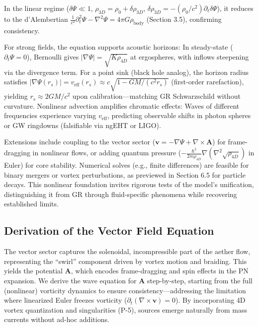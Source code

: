 \documentclass{article}
\begin{document}
In the linear regime ($\delta \Psi \ll 1$, $\rho_{3D} = \rho_0 + \delta \rho_{3D}$, $\delta \rho_{3D} = -(\rho_0 / c^2) \partial_t \delta \Psi$), it reduces to the d'Alembertian $\frac{1}{c^2} \partial_t^2 \Psi - \nabla^2 \Psi = 4\pi G \rho_{\text{body}}$ (Section 3.5), confirming consistency.

For strong fields, the equation supports acoustic horizons: In steady-state ($\partial_t \Psi = 0$), Bernoulli gives $|\nabla \Psi| = \sqrt{K \rho_{4D}}$ at ergospheres, with inflows steepening via the divergence term. For a point sink (black hole analog), the horizon radius satisfies $|\nabla \Psi(r_s)| = v_{\text{eff}}(r_s) \approx c \sqrt{1 - GM/(c^2 r_s)}$ (first-order rarefaction), yielding $r_s \approx 2GM/c^2$ upon calibration—matching GR Schwarzschild without curvature. Nonlinear advection amplifies chromatic effects: Waves of different frequencies experience varying $v_{\text{eff}}$, predicting observable shifts in photon spheres or GW ringdowns (falsifiable via ngEHT or LIGO).

Extensions include coupling to the vector sector ($\mathbf{v} = -\nabla \Psi + \nabla \times \mathbf{A}$) for frame-dragging in nonlinear flows, or adding quantum pressure ($-\frac{\hbar^2}{2m \rho_{4D}} \nabla (\nabla^2 \sqrt{\rho_{4D}})$ in Euler) for core stability. Numerical solves (e.g., finite differences) are feasible for binary mergers or vortex perturbations, as previewed in Section 6.5 for particle decays. This nonlinear foundation invites rigorous tests of the model's unification, distinguishing it from GR through fluid-specific phenomena while recovering established limits.

\subsection{Derivation of the Vector Field Equation}

The vector sector captures the solenoidal, incompressible part of the aether flow, representing the ``swirl'' component driven by vortex motion and braiding. This yields the potential $\mathbf{A}$, which encodes frame-dragging and spin effects in the PN expansion. We derive the wave equation for $\mathbf{A}$ step-by-step, starting from the full (nonlinear) vorticity dynamics to ensure consistency---addressing the limitation where linearized Euler freezes vorticity ($\partial_t (\nabla \times \mathbf{v}) = 0$). By incorporating 4D vortex quantization and singularities (P-5), sources emerge naturally from mass currents without ad-hoc additions.
\end{document}
